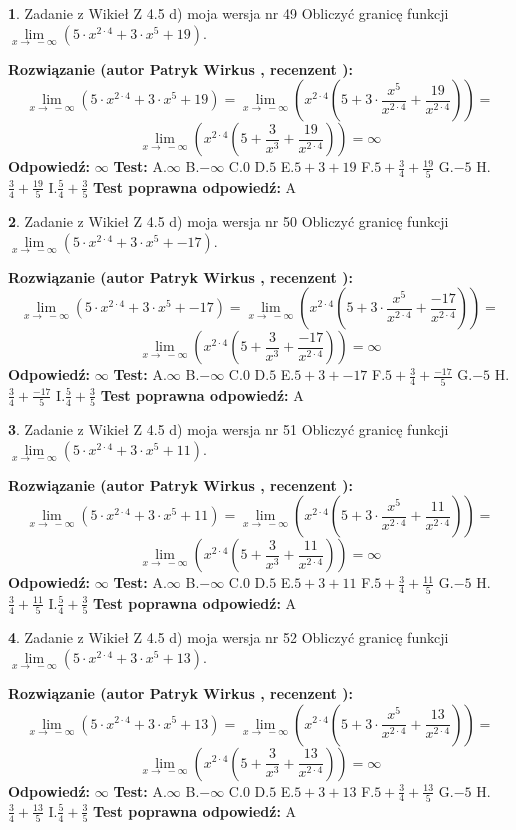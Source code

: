 \documentclass[12pt, a4paper]{article}
\theoremstyle{definition} %
\newtheorem{zad}{}
\newcommand{\zadStart}[1]{\begin{zad}#1\newline}
\newcommand{\zadStop}{\end{zad}}
\newcommand{\rozwStart}[2]{\noindent \textbf{Rozwiązanie (autor #1 , recenzent #2): }\newline}
\newcommand{\rozwStop}{\newline}
\newcommand{\odpStart}{\noindent \textbf{Odpowiedź:}\newline}
\newcommand{\odpStop}{\newline}
\newcommand{\testStart}{\noindent \textbf{Test:}\newline}
\newcommand{\testStop}{\newline}
\newcommand{\kluczStart}{\noindent \textbf{Test poprawna odpowiedź:}\newline}
\newcommand{\kluczStop}{\newline}
\begin{document}
\zadStart{Zadanie z Wikieł Z 4.5 d) moja wersja nr 49}
Obliczyć granicę funkcji  $\lim\limits_{x\to\ -\infty}(5 \cdot x^{2\cdot4}+3 \cdot x^{5}+19)$.
\zadStop
\rozwStart{Patryk Wirkus}{}
$$\lim\limits_{x\to\ -\infty}(5 \cdot x^{2\cdot4}+3 \cdot x^{5}+19) = \lim\limits_{x\to\ -\infty}(x^{2\cdot4}(5 +3 \cdot \frac{x^{5}}{x^{2\cdot4}}+\frac{19}{x^{2\cdot4}})) =$$ $$\lim\limits_{x\to\ -\infty}(x^{2\cdot4}(5 +\frac{3}{x^{3}}+\frac{19}{x^{2\cdot4}})) =\infty$$
\rozwStop
\odpStart
$\infty$
\odpStop
\testStart
A.$\infty$ B.$-\infty$ C.$0$ D.$5$ E.$5 + 3 + 19$
F.$5+\frac{3}{4}+\frac{19}{5}$ G.$-5$
H.$\frac{3}{4}+\frac{19}{5}$
I.$\frac{5}{4}+\frac{3}{5}$
\testStop
\kluczStart
A
\kluczStop



\zadStart{Zadanie z Wikieł Z 4.5 d) moja wersja nr 50}
Obliczyć granicę funkcji  $\lim\limits_{x\to\ -\infty}(5 \cdot x^{2\cdot4}+3 \cdot x^{5}+-17)$.
\zadStop
\rozwStart{Patryk Wirkus}{}
$$\lim\limits_{x\to\ -\infty}(5 \cdot x^{2\cdot4}+3 \cdot x^{5}+-17) = \lim\limits_{x\to\ -\infty}(x^{2\cdot4}(5 +3 \cdot \frac{x^{5}}{x^{2\cdot4}}+\frac{-17}{x^{2\cdot4}})) =$$ $$\lim\limits_{x\to\ -\infty}(x^{2\cdot4}(5 +\frac{3}{x^{3}}+\frac{-17}{x^{2\cdot4}})) =\infty$$
\rozwStop
\odpStart
$\infty$
\odpStop
\testStart
A.$\infty$ B.$-\infty$ C.$0$ D.$5$ E.$5 + 3 + -17$
F.$5+\frac{3}{4}+\frac{-17}{5}$ G.$-5$
H.$\frac{3}{4}+\frac{-17}{5}$
I.$\frac{5}{4}+\frac{3}{5}$
\testStop
\kluczStart
A
\kluczStop



\zadStart{Zadanie z Wikieł Z 4.5 d) moja wersja nr 51}
Obliczyć granicę funkcji  $\lim\limits_{x\to\ -\infty}(5 \cdot x^{2\cdot4}+3 \cdot x^{5}+11)$.
\zadStop
\rozwStart{Patryk Wirkus}{}
$$\lim\limits_{x\to\ -\infty}(5 \cdot x^{2\cdot4}+3 \cdot x^{5}+11) = \lim\limits_{x\to\ -\infty}(x^{2\cdot4}(5 +3 \cdot \frac{x^{5}}{x^{2\cdot4}}+\frac{11}{x^{2\cdot4}})) =$$ $$\lim\limits_{x\to\ -\infty}(x^{2\cdot4}(5 +\frac{3}{x^{3}}+\frac{11}{x^{2\cdot4}})) =\infty$$
\rozwStop
\odpStart
$\infty$
\odpStop
\testStart
A.$\infty$ B.$-\infty$ C.$0$ D.$5$ E.$5 + 3 + 11$
F.$5+\frac{3}{4}+\frac{11}{5}$ G.$-5$
H.$\frac{3}{4}+\frac{11}{5}$
I.$\frac{5}{4}+\frac{3}{5}$
\testStop
\kluczStart
A
\kluczStop



\zadStart{Zadanie z Wikieł Z 4.5 d) moja wersja nr 52}
Obliczyć granicę funkcji  $\lim\limits_{x\to\ -\infty}(5 \cdot x^{2\cdot4}+3 \cdot x^{5}+13)$.
\zadStop
\rozwStart{Patryk Wirkus}{}
$$\lim\limits_{x\to\ -\infty}(5 \cdot x^{2\cdot4}+3 \cdot x^{5}+13) = \lim\limits_{x\to\ -\infty}(x^{2\cdot4}(5 +3 \cdot \frac{x^{5}}{x^{2\cdot4}}+\frac{13}{x^{2\cdot4}})) =$$ $$\lim\limits_{x\to\ -\infty}(x^{2\cdot4}(5 +\frac{3}{x^{3}}+\frac{13}{x^{2\cdot4}})) =\infty$$
\rozwStop
\odpStart
$\infty$
\odpStop
\testStart
A.$\infty$ B.$-\infty$ C.$0$ D.$5$ E.$5 + 3 + 13$
F.$5+\frac{3}{4}+\frac{13}{5}$ G.$-5$
H.$\frac{3}{4}+\frac{13}{5}$
I.$\frac{5}{4}+\frac{3}{5}$
\testStop
\kluczStart
A
\kluczStop
\end{document}
